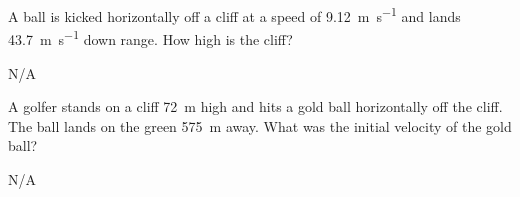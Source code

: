 \begin{question}[ID=horizontal-C-Q05,topic=projectiles,difficulty=C]
    A ball is kicked horizontally off a cliff at a speed of
        \SI{9.12}{\meter\per\second} and lands
        \SI{43.7}{\meter\per\second} down range.
    How high is the cliff?
\end{question}
\begin{solution}
    N/A
\end{solution}


\begin{question}[ID=horizontal-C-Q06,topic=projectiles,difficulty=C]
    A golfer stands on a cliff \SI{72}{\meter} high and
        hits a gold ball horizontally off the cliff.
    The ball lands on the green \SI{575}{\meter} away.
    What was the initial velocity of the gold ball?
\end{question}
\begin{solution}
    N/A
\end{solution}


\endinput

